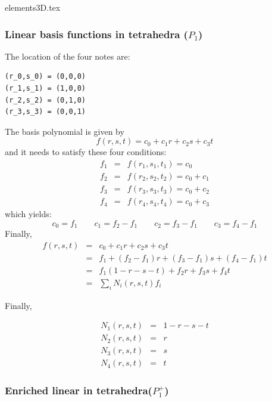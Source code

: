 \begin{flushright} {\tiny {\color{gray} elements3D.tex}} \end{flushright}

\subsubsection{Linear basis functions in tetrahedra ($P_1$)}

The location of the four notes are:
\begin{verbatim}
(r_0,s_0) = (0,0,0)
(r_1,s_1) = (1,0,0)
(r_2,s_2) = (0,1,0)
(r_3,s_3) = (0,0,1)
\end{verbatim}

The basis polynomial is given by
\[
f(r,s,t)=c_0 + c_1 r + c_2 s + c_3 t
\]
and it needs to satisfy these four conditions:
\begin{eqnarray}
f_1 &=& f(r_1,s_1,t_1) = c_0 \\
f_2 &=& f(r_2,s_2,t_2) = c_0 + c_1\\
f_3 &=& f(r_3,s_3,t_3) = c_0 + c_2\\
f_4 &=& f(r_4,s_4,t_4) = c_0 + c_3
\end{eqnarray}
which yields:
\[
c_0=f_1
\quad
\quad
c_1=f_2-f_1
\quad
\quad
c_2=f_3-f_1
\quad
\quad
c_3=f_4-f_1
\]
Finally,
\begin{eqnarray}
f(r,s,t) 
&=& c_0 + c_1 r + c_2 s + c_3 t \nonumber\\
&=& f_1 + (f_2-f_1) r + (f_3-f_1) s + (f_4-f_1) t \nonumber\\
&=& f_1 (1-r-s-t) + f_2 r + f_3 s + f_4 t \nonumber\\
&=& \sum_i N_i(r,s,t) f_i \nonumber
\end{eqnarray}

Finally,

\begin{mdframed}[backgroundcolor=blue!5]
\begin{eqnarray}
N_1(r,s,t) &=& 1-r-s-t \nonumber\\
N_2(r,s,t) &=& r \nonumber\\
N_3(r,s,t) &=& s \nonumber\\
N_4(r,s,t) &=& t \nonumber
\end{eqnarray}
\end{mdframed}

\subsubsection{Enriched linear in tetrahedra($P_1^+$)}

